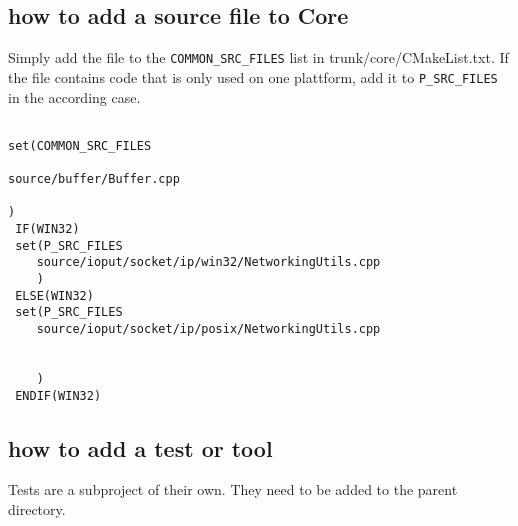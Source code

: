 \documentclass[
10pt, %
a4paper, %
oneside, %
headinclude,footinclude, %
BCOR5mm, %
]{scrartcl}
\begin{document}
\subsection{how to add a source file to Core}
Simply add the file to the \verb|COMMON_SRC_FILES| list in trunk/core/CMakeList.txt.
If the file contains code that is only used on one plattform, add it to \verb|P_SRC_FILES|
in the according case.

\label{subsec:how to add a source file to Core}
\begin{lstlisting}[caption={add source file to core}]

set(COMMON_SRC_FILES

source/buffer/Buffer.cpp

)
 IF(WIN32)
 set(P_SRC_FILES
	source/ioput/socket/ip/win32/NetworkingUtils.cpp
	)
 ELSE(WIN32)
 set(P_SRC_FILES
	source/ioput/socket/ip/posix/NetworkingUtils.cpp

	
	)
 ENDIF(WIN32)
\end{lstlisting}

\subsection{how to add a test or tool}

Tests are a subproject of their own.
They need to be added to the parent directory.
\end{document}

